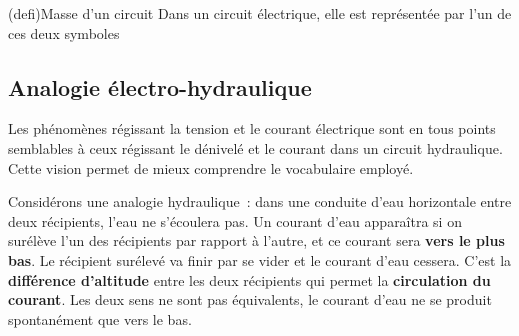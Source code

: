 \documentclass[../../main/main.tex]{subfiles}
\begin{document}
\begin{tcb*}[label=def:masse, sidebyside](defi){Masse d'un circuit}
	\vspace{-15pt}
	\tcblower
	Dans un circuit électrique, elle est représentée par l'un de ces deux
	symboles
	\begin{center}
	\end{center}
\end{tcb*}

\subsection{Analogie électro-hydraulique}

Les phénomènes régissant la tension et le courant électrique sont en tous points
semblables à ceux régissant le dénivelé et le courant dans un circuit
hydraulique. Cette vision permet de mieux comprendre le vocabulaire employé.

Considérons une analogie hydraulique~: dans une conduite d'eau horizontale entre
deux récipients, l'eau ne s'écoulera pas. Un courant d'eau apparaîtra si on
surélève l'un des récipients par rapport à l'autre, et ce courant sera
\textbf{vers le plus bas}. Le récipient surélevé va finir par se vider et le
courant d'eau cessera. C'est la \textbf{différence d'altitude} entre les deux
récipients qui permet la \textbf{circulation du courant}. Les deux sens ne sont
pas équivalents, le courant d'eau ne se produit spontanément que vers le bas.
\end{document}
